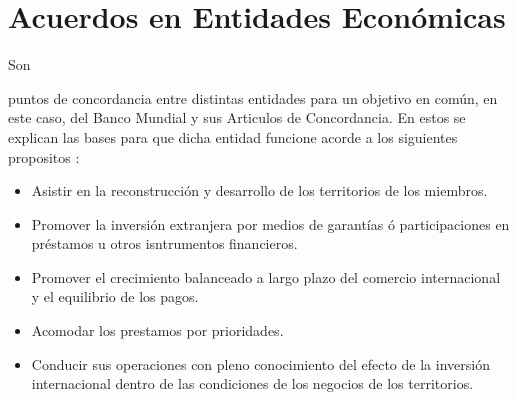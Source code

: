 \documentclass[stu, 12pt, letterpaper, donotrepeattitle, floatsintext, natbib]{apa7}
\begin{document}
\section{Acuerdos en Entidades Económicas}
Son \begin{justifying}
  puntos de concordancia entre distintas entidades para un objetivo en común, en este caso, 
  del Banco Mundial y sus Articulos de Concordancia. En estos se explican las bases para que dicha
  entidad funcione acorde a los siguientes propositos \citep{international-bank-for-reconstruction-and-development-2021}: %
  \begin{itemize}
    \item Asistir en la reconstrucción y desarrollo de los territorios de los miembros.
    \item Promover la inversión extranjera por medios de garantías ó participaciones en préstamos u otros isntrumentos financieros.
    \item Promover el crecimiento balanceado a largo plazo del comercio internacional y el equilibrio de los pagos.
    \item Acomodar los prestamos por prioridades.
    \item Conducir sus operaciones con pleno conocimiento del efecto de la inversión internacional dentro de las condiciones de los negocios de los territorios.
  \end{itemize}\par
\end{justifying}
\vspace{\baselineskip}


\newpage
\setcounter{secnumdepth}{0} %
\renewcommand\refname{\textbf{Referencias}}
\end{document}
